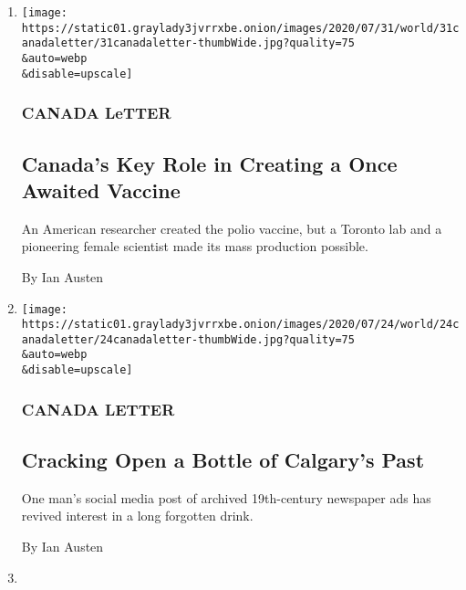 \begin{enumerate}
\def\labelenumi{\arabic{enumi}.}
\item
  \href{/2020/07/31/world/canada/leone-farrell-chemist.html}{}

  \texttt{[image: https://static01.graylady3jvrrxbe.onion/images/2020/07/31/world/31canadaletter/31canadaletter-thumbWide.jpg?quality=75\\\&auto=webp\\\&disable=upscale]}

  \hypertarget{canada-letter}{%
  \subsubsection{CANADA LeTTER}\label{canada-letter}}

  \hypertarget{canadas-key-role-in-creating-a-once-awaited-vaccine}{%
  \subsection{Canada's Key Role in Creating a Once Awaited
  Vaccine}\label{canadas-key-role-in-creating-a-once-awaited-vaccine}}

  An American researcher created the polio vaccine, but a Toronto lab
  and a pioneering female scientist made its mass production possible.

  By Ian Austen
\item
  \href{/2020/07/24/world/canada/cronk.html}{}

  \texttt{[image: https://static01.graylady3jvrrxbe.onion/images/2020/07/24/world/24canadaletter/24canadaletter-thumbWide.jpg?quality=75\\\&auto=webp\\\&disable=upscale]}

  \hypertarget{canada-letter-1}{%
  \subsubsection{CANADA LETTER}\label{canada-letter-1}}

  \hypertarget{cracking-open-a-bottle-of-calgarys-past}{%
  \subsection{Cracking Open a Bottle of Calgary's
  Past}\label{cracking-open-a-bottle-of-calgarys-past}}

  One man's social media post of archived 19th-century newspaper ads has
  revived interest in a long forgotten drink.

  By Ian Austen
\item
  \href{/2020/07/18/world/canada/bus-crash-glacier-jasper-alberta.html}{}


\end{enumerate}
